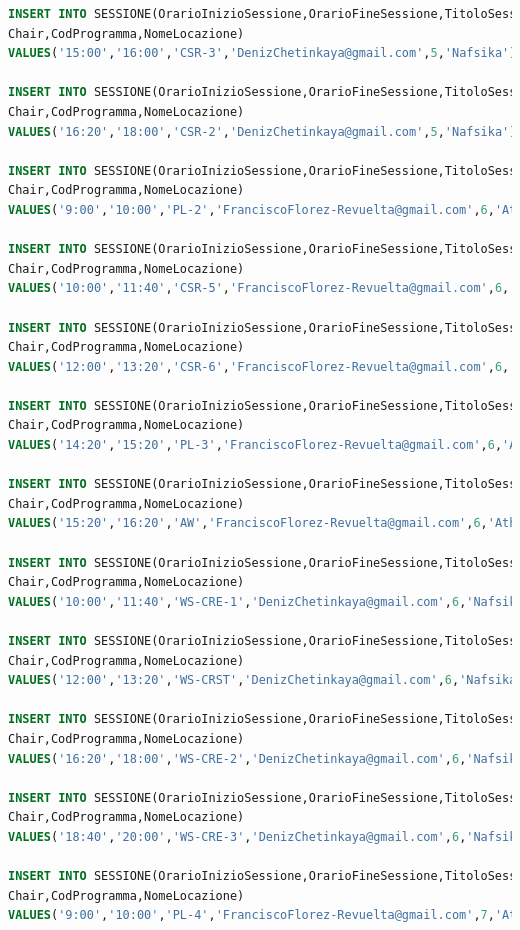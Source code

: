 \documentclass[a4page]{article}
\begin{document}
\begin{lstlisting}[language=SQL,
        deletekeywords={IDENTITY,INT},
        morekeywords={clustered},    
        framesep=10pt,
        framextopmargin=10pt]
INSERT INTO SESSIONE(OrarioInizioSessione,OrarioFineSessione,TitoloSessione,
Chair,CodProgramma,NomeLocazione)
VALUES('15:00','16:00','CSR-3','DenizChetinkaya@gmail.com',5,'Nafsika');

INSERT INTO SESSIONE(OrarioInizioSessione,OrarioFineSessione,TitoloSessione,
Chair,CodProgramma,NomeLocazione)
VALUES('16:20','18:00','CSR-2','DenizChetinkaya@gmail.com',5,'Nafsika');

INSERT INTO SESSIONE(OrarioInizioSessione,OrarioFineSessione,TitoloSessione,
Chair,CodProgramma,NomeLocazione)
VALUES('9:00','10:00','PL-2','FranciscoFlorez-Revuelta@gmail.com',6,'Athena');

INSERT INTO SESSIONE(OrarioInizioSessione,OrarioFineSessione,TitoloSessione,
Chair,CodProgramma,NomeLocazione)
VALUES('10:00','11:40','CSR-5','FranciscoFlorez-Revuelta@gmail.com',6,'Athena');

INSERT INTO SESSIONE(OrarioInizioSessione,OrarioFineSessione,TitoloSessione,
Chair,CodProgramma,NomeLocazione)
VALUES('12:00','13:20','CSR-6','FranciscoFlorez-Revuelta@gmail.com',6,'Athena');

INSERT INTO SESSIONE(OrarioInizioSessione,OrarioFineSessione,TitoloSessione,
Chair,CodProgramma,NomeLocazione)
VALUES('14:20','15:20','PL-3','FranciscoFlorez-Revuelta@gmail.com',6,'Athena');

INSERT INTO SESSIONE(OrarioInizioSessione,OrarioFineSessione,TitoloSessione,
Chair,CodProgramma,NomeLocazione)
VALUES('15:20','16:20','AW','FranciscoFlorez-Revuelta@gmail.com',6,'Athena');

INSERT INTO SESSIONE(OrarioInizioSessione,OrarioFineSessione,TitoloSessione,
Chair,CodProgramma,NomeLocazione)
VALUES('10:00','11:40','WS-CRE-1','DenizChetinkaya@gmail.com',6,'Nafsika');

INSERT INTO SESSIONE(OrarioInizioSessione,OrarioFineSessione,TitoloSessione,
Chair,CodProgramma,NomeLocazione)
VALUES('12:00','13:20','WS-CRST','DenizChetinkaya@gmail.com',6,'Nafsika');

INSERT INTO SESSIONE(OrarioInizioSessione,OrarioFineSessione,TitoloSessione,
Chair,CodProgramma,NomeLocazione)
VALUES('16:20','18:00','WS-CRE-2','DenizChetinkaya@gmail.com',6,'Nafsika');

INSERT INTO SESSIONE(OrarioInizioSessione,OrarioFineSessione,TitoloSessione,
Chair,CodProgramma,NomeLocazione)
VALUES('18:40','20:00','WS-CRE-3','DenizChetinkaya@gmail.com',6,'Nafsika');

INSERT INTO SESSIONE(OrarioInizioSessione,OrarioFineSessione,TitoloSessione,
Chair,CodProgramma,NomeLocazione)
VALUES('9:00','10:00','PL-4','FranciscoFlorez-Revuelta@gmail.com',7,'Athena');


\end{lstlisting}
\end{document}
